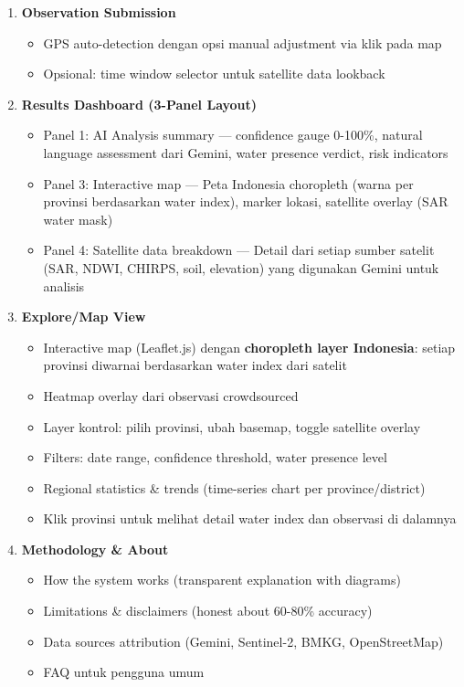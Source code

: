 \documentclass[12pt,a4paper]{article}
\begin{document}
\begin{enumerate}
  \item \textbf{Observation Submission}
  \begin{itemize}
    \item GPS auto-detection dengan opsi manual adjustment via klik pada map
    \item Opsional: time window selector untuk satellite data lookback
  \end{itemize}

  \item \textbf{Results Dashboard (3-Panel Layout)}
  \begin{itemize}
    \item Panel 1: AI Analysis summary — confidence gauge 0-100\%, natural language assessment dari Gemini, water presence verdict, risk indicators
    \item Panel 3: Interactive map — Peta Indonesia choropleth (warna per provinsi berdasarkan water index), marker lokasi, satellite overlay (SAR water mask)
    \item Panel 4: Satellite data breakdown — Detail dari setiap sumber satelit (SAR, NDWI, CHIRPS, soil, elevation) yang digunakan Gemini untuk analisis
  \end{itemize}

  \item \textbf{Explore/Map View}
  \begin{itemize}
    \item Interactive map (Leaflet.js) dengan \textbf{choropleth layer Indonesia}: setiap provinsi diwarnai berdasarkan water index dari satelit
    \item Heatmap overlay dari observasi crowdsourced
    \item Layer kontrol: pilih provinsi, ubah basemap, toggle satellite overlay
    \item Filters: date range, confidence threshold, water presence level
    \item Regional statistics \& trends (time-series chart per province/district)
    \item Klik provinsi untuk melihat detail water index dan observasi di dalamnya
  \end{itemize}

  \item \textbf{Methodology \& About}
  \begin{itemize}
    \item How the system works (transparent explanation with diagrams)
    \item Limitations \& disclaimers (honest about 60-80\% accuracy)
    \item Data sources attribution (Gemini, Sentinel-2, BMKG, OpenStreetMap)
    \item FAQ untuk pengguna umum
  \end{itemize}
\end{enumerate}
\end{document}
